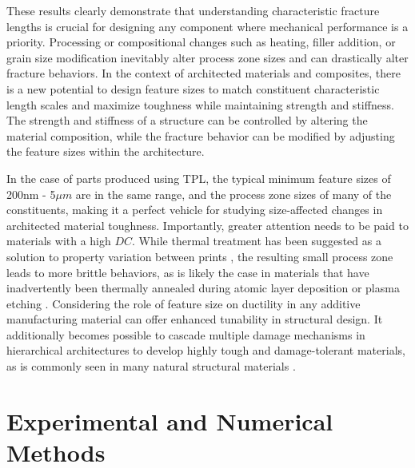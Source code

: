 \documentclass[11pt]{article}
\providecommand{\um}[0]{$\mu m$}
\providecommand{\DC}[0]{$DC$}
\begin{document}
        These results clearly demonstrate that understanding characteristic fracture lengths is crucial for designing any component where mechanical performance is a priority. 
        Processing or compositional changes such as heating, filler addition, or grain size modification inevitably alter process zone sizes and can drastically alter fracture behaviors.
        In the context of architected materials and composites, there is a new potential to design feature sizes to match constituent characteristic length scales and maximize toughness while maintaining strength and stiffness.
        The strength and stiffness of a structure can be controlled by altering the material composition, while the fracture behavior can be modified by adjusting the feature sizes within the architecture. 
        
        In the case of parts produced using TPL, the typical minimum feature sizes of 200nm - 5\um{} are in the same range, and the process zone sizes of many of the constituents, making it a perfect vehicle for studying size-affected changes in architected material toughness.
        Importantly, greater attention needs to be paid to materials with a high \DC{}.
        While thermal treatment has been suggested as a solution to property variation between prints \cite{bauer2020thermal}, the resulting small process zone leads to more brittle behaviors, as is likely the case in materials that have inadvertently been thermally annealed during atomic layer deposition or plasma etching \cite{meza2015resilient, moestopo2023knots}.
        Considering the role of feature size on ductility in any additive manufacturing material can offer enhanced tunability in structural design.
        It additionally becomes possible to cascade multiple damage mechanisms in hierarchical architectures to develop highly tough and damage-tolerant materials, as is commonly seen in many natural structural materials \cite{huang2019multiscale}.


    \section*{Experimental and Numerical Methods}
\end{document}

